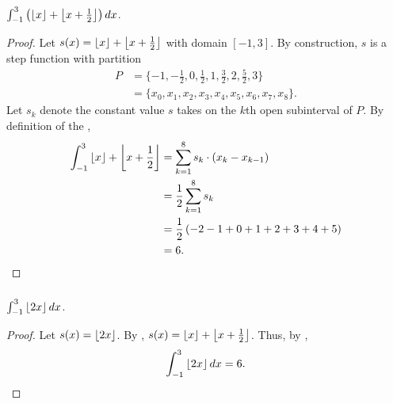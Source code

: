 \documentclass{report}
\begin{document}
\subsubsection{}%
\label{ssub:exercise-1.15.1c}

$\int_{-1}^3 \left(\left\lfloor x\right\rfloor + \left\lfloor x + \frac{1}{2}\right\rfloor\right) \mathop{dx}$.

\begin{proof}

  Let $s(x) = \left\lfloor x\right\rfloor + \left\lfloor x + \frac{1}{2}\right\rfloor$ with domain $[-1, 3]$.
  By construction, $s$ is a step function with partition
    \begin{align*}
      P
        & = \{-1, -\frac{1}{2}, 0, \frac{1}{2}, 1, \frac{3}{2}, 2, \frac{5}{2},
              3\} \\
        & = \{x_0, x_1, x_2, x_3, x_4, x_5, x_6, x_7, x_8\}.
    \end{align*}
  Let $s_k$ denote the constant value $s$ takes on the $k$th open subinterval of
    $P$.
  By definition of the ,
    \begin{align*}
      \int_{-1}^3 \left\lfloor x\right\rfloor + \left\lfloor x + \frac{1}{2}\right\rfloor
        & = \sum_{k=1}^8 s_k \cdot (x_k - x_{k-1}) \\
        & = \frac{1}{2} \sum_{k=1}^8 s_k \\
        & = \frac{1}{2} \left( -2 - 1 + 0 + 1 + 2 + 3 + 4 + 5 \right) \\
        & = 6.
    \end{align*}

\end{proof}

\subsubsection{}%
\label{ssub:exercise-1.15.1e}

$\int_{-1}^3 \left\lfloor2x\right\rfloor \mathop{dx}$.

\begin{proof}

  Let $s(x) = \left\lfloor2x\right\rfloor$.
  By ,
    $s(x) = \left\lfloor x\right\rfloor + \left\lfloor x + \frac{1}{2}\right\rfloor$.
  Thus, by ,
    $$\int_{-1}^3 \left\lfloor2x\right\rfloor \mathop{dx} = 6.$$

\end{proof}

\subsection{}%
\label{sub:exercise-1.15.3}
\end{document}
